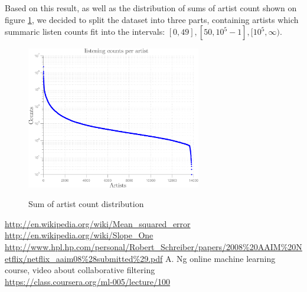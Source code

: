 \documentclass{report}
\begin{document}
Based on this result, as well as the distribution of sums of artist count shown on figure \ref{fig:artistsDist}, we decided to split the dataset into three parts, containing artists which summaric listen counts fit into the intervals:  $[0, 49], [50, 10^5-1], [10^5, \infty)$.
\begin{figure}[!t]
\center

\includegraphics[width=3in]{../figures/artists-distribution-crop.pdf} \label{fig:artistsDist}
\caption{Sum of artist count distribution}
\end{figure}
\fi
\begingroup
\renewcommand{\cleardoublepage}{}
\renewcommand{\clearpage}{}
\begin{thebibliography}{9}

  \url{http://en.wikipedia.org/wiki/Mean_squared_error}
  \url{http://en.wikipedia.org/wiki/Slope_One}
  \url{http://www.hpl.hp.com/personal/Robert_Schreiber/papers/2008\%20AAIM\%20Netflix/netflix_aaim08\%28submitted\%29.pdf}
   A. Ng online machine learning course,
   video about collaborative filtering\\
  \url{https://class.coursera.org/ml-005/lecture/100}


\end{thebibliography}
\endgroup
\end{document}
